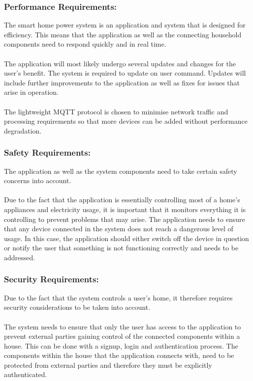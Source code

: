 \documentclass[10pt,twocolumn]{witseiepaper}
\begin{document}
	\subsubsection{Performance Requirements:}
	The smart home power system is an application and system that is designed for efficiency. This means that the application as well as the connecting household components need to respond quickly and in real time. 
	\\\\
	The application will most likely undergo several updates and changes for the user's benefit. The system is required to update on user command. Updates will include further improvements to the application as well as fixes for issues that arise in operation.
	\\\\
	The lightweight MQTT protocol is chosen to minimise network traffic and processing requirements so that more devices can be added without performance degradation. 
	
	\subsubsection{Safety Requirements:} 
	The application as well as the system components need to take certain safety concerns into account. 
	\\\\
	Due to the fact that the application is essentially controlling most of a home's appliances and electricity usage, it is important that it monitors everything it is controlling to prevent problems that may arise. The application needs to ensure that any device connected in the system does not reach a dangerous level of usage. In this case, the application should either switch off the device in question or notify the user that something is not functioning correctly and needs to be addressed. 
	
	\subsubsection{Security Requirements:}
	Due to the fact that the system controls a user's home, it therefore requires security considerations to be taken into account.
	\\\\
	The system needs to ensure that only the user has access to the application to prevent external parties gaining control of the connected components within a house. This can be done with a signup, login and authentication process. 
	The components within the house that the application connects with, need to be protected from external parties and therefore they must be explicitly authenticated. 
	
\end{document}
